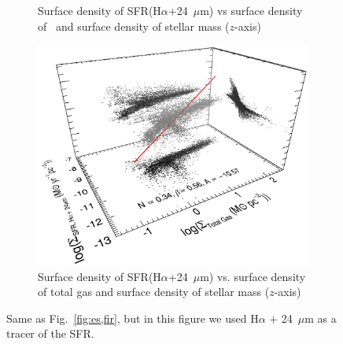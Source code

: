 \begin{figure}
\begin{subfigure}[b]{0.5\textwidth}
        \captionsetup{font=tiny}
        \caption{Surface density of SFR(H$\alpha$+24~$\mu$m) vs surface density of \hi\ and surface density of stellar mass ($z$-axis)}
        \label{fig:es,all,halpha,hi}
    \end{subfigure}
    \hfill
    \begin{subfigure}[b]{0.5\textwidth}
        \centering
        \includegraphics[width=\textwidth]{../image_paper1/es_tot_halpha_vs_tot2_f.png}
        \captionsetup{font=tiny}
        \caption{Surface density of SFR(H$\alpha$+24~$\mu$m) vs. surface density of total gas and surface density of stellar mass ($z$-axis)}
        \label{fig:es,all,halpha,tot}
    \end{subfigure}
    \caption{Same as Fig.~\ref{fig:es,fir}, but in this figure we used H$\alpha$ + 24~$\mu$m as a tracer of the SFR.}
\end{figure}

